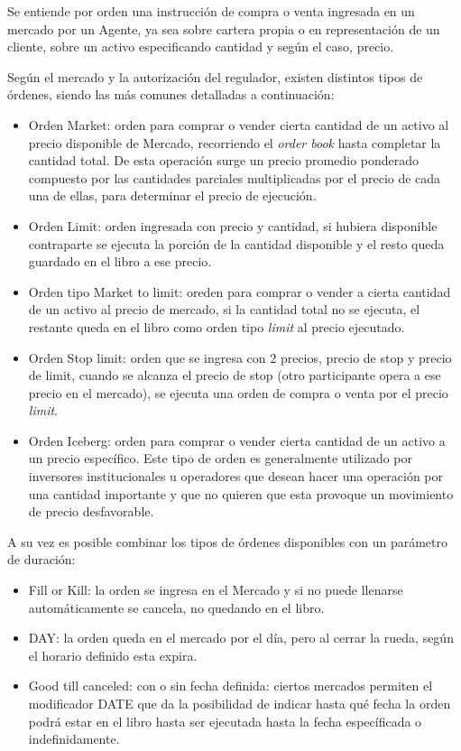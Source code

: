 Se entiende por orden una instrucción de compra o venta ingresada en un mercado
por un Agente, ya sea sobre cartera propia o en representación de un cliente,
sobre un activo especificando cantidad y según el caso, precio.

Según el mercado y la autorización del regulador, existen distintos tipos de órdenes, 
siendo las más comunes detalladas a continuación:
\begin{itemize}
 \item Orden Market: orden para comprar o vender cierta cantidad de un activo
al precio disponible de Mercado, recorriendo el \emph{order book} hasta
completar la cantidad total. De esta operación surge un precio promedio
ponderado compuesto por las cantidades parciales multiplicadas por el precio de
cada una de ellas, para determinar el precio de ejecución.
 \item Orden Limit: orden ingresada con precio y cantidad, si hubiera
disponible contraparte se ejecuta la porción de la cantidad disponible y el
resto queda guardado en el libro a ese precio. 
 \item Orden tipo Market to limit: oreden para comprar o vender a cierta
cantidad de un activo al precio de mercado, si la cantidad total no se ejecuta,
el restante queda en el libro como orden tipo \emph{limit} al precio ejecutado.
 \item Orden Stop limit: orden que se ingresa con 2 precios, precio de stop y
precio de limit, cuando se alcanza el precio de stop (otro participante opera a
ese precio en el mercado), se ejecuta una orden de compra o venta por el precio
\emph{limit}.
 \item Orden Iceberg: orden para comprar o vender cierta cantidad de un activo
a un precio específico. Este tipo de orden es generalmente utilizado por
inversores institucionales u operadores que desean hacer una operación por una
cantidad importante y que no quieren que esta provoque un movimiento de precio
desfavorable.
\end{itemize}

A su vez es posible combinar los tipos de órdenes disponibles con un parámetro de duración:
\begin{itemize}
 \item Fill or Kill: la orden se ingresa en el Mercado y si no puede llenarse
automáticamente se cancela, no quedando en el libro.
 \item DAY: la orden queda en el mercado por el día, pero al cerrar la rueda, según el 
 horario definido esta expira.
 \item Good till canceled: con o sin fecha definida: ciertos mercados permiten
el modificador DATE que da la posibilidad de indicar hasta qué fecha la orden
podrá estar en el libro hasta ser ejecutada hasta la fecha específicada o
indefinidamente. 
\end{itemize}

